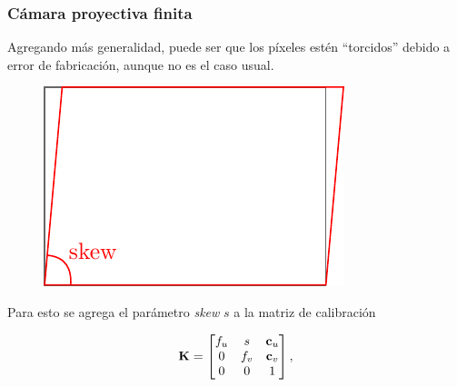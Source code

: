 \begin{frame}
    \frametitle{Cámara proyectiva finita}
    \footnotesize
    
    Agregando más generalidad, puede ser que los píxeles estén ``torcidos'' debido a error de fabricación, aunque no es el caso usual.
    
    \begin{figure}[!h]
        \includegraphics[width=0.3\columnwidth]{images/camera/pixel_skew.pdf}
    \end{figure}
    
    Para esto se agrega el parámetro \emph{skew} $s$ a la matriz de calibración
    
    \begin{equation*}
        \boldsymbol{\mathbf{K}}=
        \begin{bmatrix}
            f_{u} & s & \boldsymbol{\mathbf{c}}_{u}\\
            0 & f_{v} & \boldsymbol{\mathbf{c}}_{v}\\
            0 & 0 & 1
        \end{bmatrix},
    \end{equation*}
    
\end{frame}

